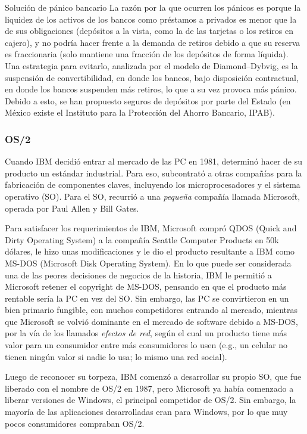 \documentclass[12pt]{scrartcl}
\begin{document}
\begin{exbox}{Solución de pánico bancario}
	La razón por la que ocurren los pánicos es porque la liquidez de los activos de los bancos como préstamos a privados es menor que la de sus obligaciones (depósitos a la vista, como la de las tarjetas o los retiros en cajero), y no podría hacer frente a la demanda de retiros debido a que su reserva es fraccionaria (solo mantiene una fracción de los depósitos de forma líquida). Una estrategia para evitarlo, analizada por el modelo de Diamond–Dybvig, es la suspensión de convertibilidad, en donde los bancos, bajo disposición contractual, en donde los bancos suspenden más retiros, lo que a su vez provoca más pánico. Debido a esto, se han propuesto seguros de depósitos por parte del Estado (en México existe el Instituto para la Protección del Ahorro Bancario, IPAB).  
	
\end{exbox}

\subsubsection{OS/2}

Cuando IBM decidió entrar al mercado de las PC en 1981, determinó hacer de su producto un estándar industrial. Para eso, subcontrató a otras compañías para la fabricación de componentes claves, incluyendo los microprocesadores y el sistema operativo (SO). Para el SO, recurrió a una \textit{pequeña} compañía llamada Microsoft, operada por Paul Allen y Bill Gates. 

Para satisfacer los requerimientos de IBM, Microsoft compró QDOS (Quick and Dirty Operating System) a la compañía Seattle Computer Products en 50k dólares, le hizo unas modificaciones y le dio el producto resultante a IBM como MS-DOS (Microsoft Disk Operating System). En lo que puede ser considerada una de las peores decisiones de negocios de la historia, IBM le permitió a Microsoft retener el copyright de MS-DOS, pensando en que el producto más rentable sería la PC en vez del SO. Sin embargo, las PC se convirtieron en un bien primario fungible, con muchos competidores entrando al mercado, mientras que Microsoft se volvió dominante en el mercado de software debido a MS-DOS, por la vía de los llamados \textit{efectos de red}, según el cual un producto tiene más valor para un consumidor entre más consumidores lo usen (e.g., un celular no tienen ningún valor si nadie lo usa; lo mismo una red social). 

Luego de reconocer su torpeza, IBM comenzó a desarrollar su propio SO, que fue liberado con el nombre de OS/2 en 1987, pero Microsoft ya había comenzado a liberar versiones de Windows, el principal competidor de OS/2. Sin embargo, la mayoría de las aplicaciones desarrolladas eran para Windows, por lo que muy pocos consumidores compraban OS/2. 
\end{document}
